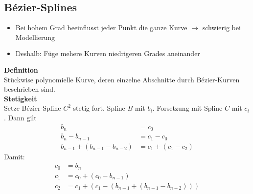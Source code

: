 \subsection{Bézier-Splines}%
\label{kuf:sub:bezier-splines}

\begin{itemize}
	\item Bei hohem Grad beeinflusst jeder Punkt die ganze Kurve $\rightarrow$ schwierig bei Modellierung
	\item Deshalb: Füge mehere Kurven niedrigeren Grades aneinander
\end{itemize}
\textbf{Definition}\\
Stückwise polynomielle Kurve, deren einzelne Abschnitte durch Bézier-Kurven beschrieben sind.\\

\textbf{Stetigkeit}\\
Setze Bézier-Spline $C^2$ stetig fort. Spline $B$ mit $b_i$.
Forsetzung mit Spline $C$ mit $c_i$. Dann gilt
\begin{align*}
  b_n &= c_0\\
  b_n - b_{n-1} &= c_1 - c_0\\
  b_{n-1} + (b_{n-1} -  b_{n-2}) &= c_1 + (c_1 - c_2)
\end{align*}
Damit:
\begin{align*}
	c_0 &= b_n\\
	c_1 &= c_0 + (c_0 - b_{n-1})\\
	c_2 &= c_1 + (c_1 - (b_{n-1} + (b_{n-1} - b_{n-2})))
\end{align*}